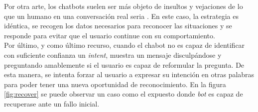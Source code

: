 Por otra arte, los chatbots suelen ser más objeto de insultos y vejaciones de lo que un humano en una conversación real seria \cite{shouldInteract}. En este caso, la estrategia es idéntica, se recogen los datos necesarios para reconocer las situaciones y se responde para evitar que el usuario continue con su comportamiento.\\


Por último, y como último recurso, cuando el chabot no es capaz de identificar con suficiente confianza un \textit{intent}, muestra un mensaje disculpándose y preguntando amablemente si el usuario es capaz de reformular la pregunta. De esta manera, se intenta forzar al usuario a expresar su intención en otras palabras para poder tener una nueva oportunidad de reconocimiento. En la figura \ref{fig:recover} se puede observar un caso como el expuesto donde \textit{bot} es capaz de recuperase ante un fallo inicial.\\

